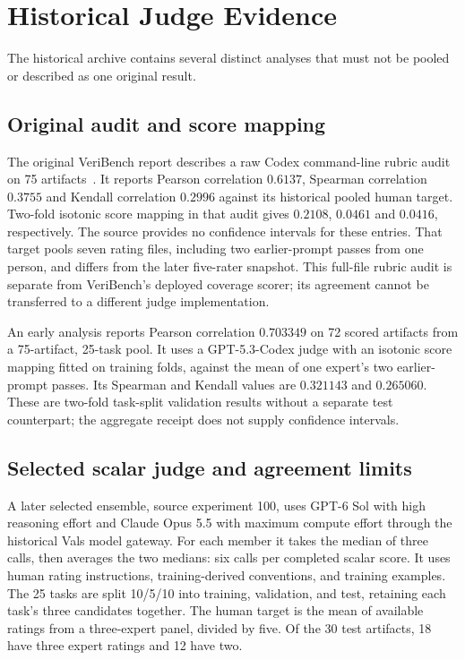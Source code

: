 \section{Historical Judge Evidence}
\label{sec:legacy}
The historical archive contains several distinct analyses that must not be pooled or described as one original result.
\subsection{Original audit and score mapping}
The original VeriBench report describes a raw Codex command-line rubric audit on 75 artifacts~\citep{veribench2026}.
It reports Pearson correlation $0.6137$, Spearman correlation $0.3755$ and Kendall correlation $0.2996$ against its historical pooled human target.
Two-fold isotonic score mapping in that audit gives $0.2108$, $0.0461$ and $0.0416$, respectively.
The source provides no confidence intervals for these entries.
That target pools seven rating files, including two earlier-prompt passes from one person, and differs from the later five-rater snapshot.
This full-file rubric audit is separate from VeriBench's deployed coverage scorer; its agreement cannot be transferred to a different judge implementation.

An early analysis reports Pearson correlation $0.703349$ on 72 scored artifacts from a 75-artifact, 25-task pool.
It uses a GPT-5.3-Codex judge with an isotonic score mapping fitted on training folds, against the mean of one expert's two earlier-prompt passes.
Its Spearman and Kendall values are $0.321143$ and $0.265060$.
These are two-fold task-split validation results without a separate test counterpart; the aggregate receipt does not supply confidence intervals.

\subsection{Selected scalar judge and agreement limits}
A later selected ensemble, source experiment 100, uses GPT-6 Sol with high reasoning effort and Claude Opus 5.5 with maximum compute effort through the historical Vals model gateway.
For each member it takes the median of three calls, then averages the two medians: six calls per completed scalar score.
It uses human rating instructions, training-derived conventions, and training examples.
The 25 tasks are split 10/5/10 into training, validation, and test, retaining each task's three candidates together.
The human target is the mean of available ratings from a three-expert panel, divided by five.
Of the 30 test artifacts, 18 have three expert ratings and 12 have two.

